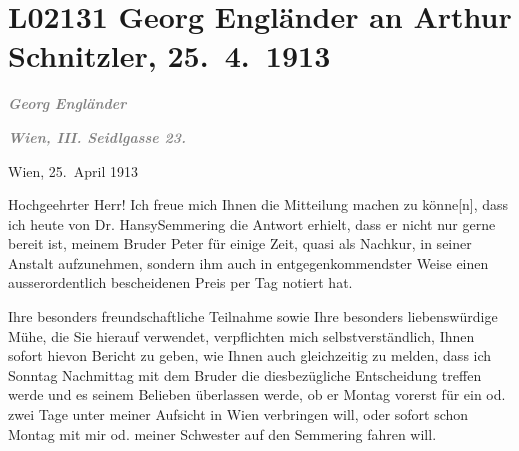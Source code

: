 

\section[Georg Engländer an Arthur Schnitzler, 25. 4. 1913]{L02131 Georg Engländer an Arthur Schnitzler, 25. 4. 1913}
\nopagebreak{}
\rehead{ }\normalsize\beginnumbering{}
\toendnotes[C]{\smallbreak\pagebreak[2]}
\toendnotes[C]{\smallbreak}
\pstart
           {\pb}\textcolor{gray}{\textbf{\textit{Georg Engländer}}}\pend
           
\pstart
           \textcolor{gray}{\textbf{\textit{Wien, III. Seidlgasse 23.}}}\pend
           
\pstart
           \raggedleft{}Wien, 25. April 1913\pend
           
\pstart{}Hochgeehrter Herr!\pend\vspace{0.5em}
\pstart
           Ich freue mich Ihnen die Mitteilung machen zu könne{[}n{]}, dass ich
               heute von Dr. HansySemmering die Antwort erhielt, dass er nicht nur
               gerne bereit ist, meinem Bruder Peter für
               einige Zeit, quasi als Nachkur, in seiner Anstalt aufzunehmen, sondern ihm auch in
               entgegenkommendster Weise einen ausserordentlich bescheidenen Preis per Tag notiert
               hat.\pend
           
\pstart
           Ihre besonders freundschaftliche Teilnahme sowie Ihre besonders liebenswürdige Mühe,
               die Sie hierauf verwendet, verpflichten mich selbstverständlich, Ihnen sofort hievon
               Bericht zu geben, wie Ihnen auch gleichzeitig zu melden, dass ich
                  Sonntag{ }{\pb}Nachmittag mit dem Bruder die diesbezügliche Entscheidung treffen werde und es
               seinem Belieben überlassen werde, ob er Montag vorerst für ein od. zwei
               Tage unter meiner Aufsicht in Wien verbringen
               will, oder sofort schon Montag mit mir od. meiner Schwester auf den Semmering fahren will.\pend
           
